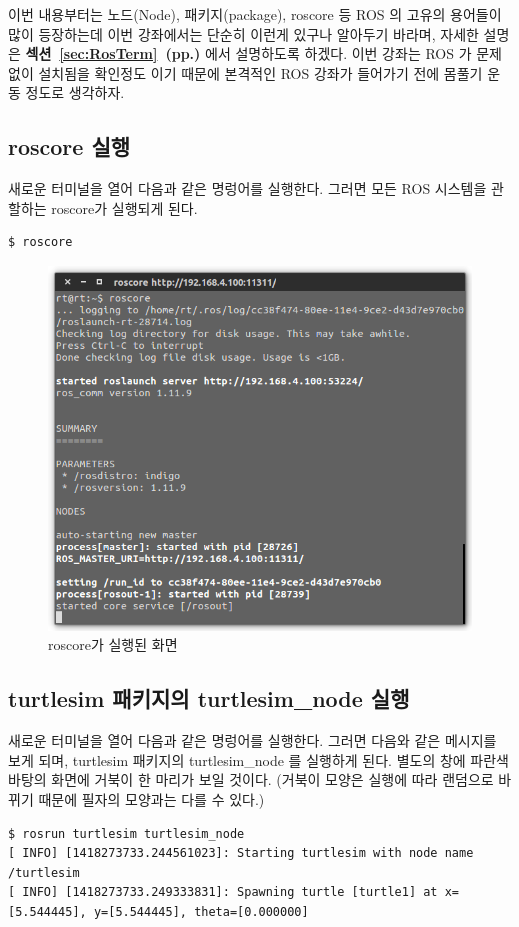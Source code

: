 이번 내용부터는 노드(Node), 패키지(package), roscore 등 ROS 의 고유의 용어들이 많이 등장하는데 이번 강좌에서는 단순히 이런게 있구나 알아두기 바라며, 자세한 설명은 \textbf{섹션~\ref{sec:RosTerm}~(pp.\pageref{sec:RosTerm})} 에서 설명하도록 하겠다. 이번 강좌는 ROS 가 문제없이 설치됨을 확인정도 이기 때문에 본격적인 ROS 강좌가 들어가기 전에 몸풀기 운동 정도로 생각하자.

\subsection{roscore 실행}
새로운 터미널을 열어 다음과 같은 명렁어를 실행한다. 그러면 모든 ROS 시스템을 관할하는 roscore가 실행되게 된다.
\\
\begin{lstlisting}[language=ROS]
$ roscore
\end{lstlisting}

\begin{figure}[h]
\centering\includegraphics[width=0.7\columnwidth]{pictures/chapter2/roscore.png}
\caption{roscore가 실행된 화면}
\end{figure}

\subsection{turtlesim 패키지의 turtlesim\_node 실행}
새로운 터미널을 열어 다음과 같은 명렁어를 실행한다. 그러면 다음와 같은 메시지를 보게 되며, turtlesim 패키지의 turtlesim\_node 를 실행하게 된다. 별도의 창에 파란색 바탕의 화면에 거북이 한 마리가 보일 것이다. (거북이 모양은 실행에 따라 랜덤으로 바뀌기 때문에 필자의 모양과는 다를 수 있다.)
\\
\begin{lstlisting}[language=ROS]
$ rosrun turtlesim turtlesim_node
[ INFO] [1418273733.244561023]: Starting turtlesim with node name /turtlesim
[ INFO] [1418273733.249333831]: Spawning turtle [turtle1] at x=[5.544445], y=[5.544445], theta=[0.000000]
\end{lstlisting}

